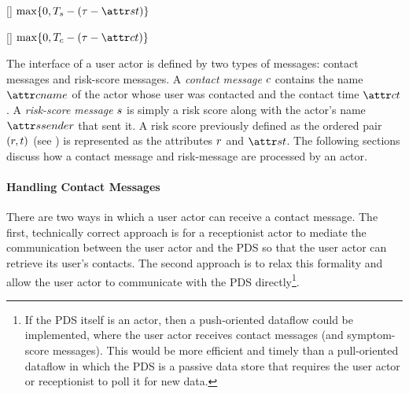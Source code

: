 %
\begin{function}{\nScoreTtl}[\vScore]
    \State \Return $\max \{0, \pScoreTtl - (\pRefTime - \aScoreTime)\}$
\end{function}
\begin{function}{\nContactTtl}[\vContact]
    \State \Return $\max \{0, \pContactTtl - (\pRefTime - \aContactTime)\}$
\end{function}
%
The interface of a user actor is defined by two types of messages: contact messages and risk-score messages. A \emph{contact message} $c$ contains the name $\aContactName$ of the actor whose user was contacted and the contact time $\aContactTime$. A \emph{risk-score message} $s$ is simply a risk score along with the actor's name $\aScoreSender$ that sent it. A risk score previously defined as the ordered pair $(r, t)$ (see ) is represented as the attributes $r$ and $\aScoreTime$. The following sections discuss how a contact message and risk-message are processed by an actor.

\paragraph{Handling Contact Messages}\label{sec:contact-message-handling}

There are two ways in which a user actor can receive a contact message. The first, technically correct approach is for a receptionist actor to mediate the communication between the user actor and the PDS so that the user actor can retrieve its user's contacts. The second approach is to relax this formality and allow the user actor to communicate with the PDS directly\footnote{If the PDS itself is an actor, then a push-oriented dataflow could be implemented, where the user actor receives contact messages (and symptom-score messages). This would be more efficient and timely than a pull-oriented dataflow in which the PDS is a passive data store that requires the user actor or receptionist to poll it for new data.}.

